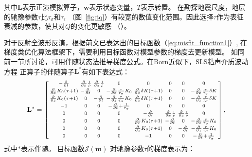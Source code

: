 其中$\mathbf{L}$表示正演模拟算子，$\mathbf{w}$表示状态变量，$T$表示转置。
在勘探地震尺度，地层的驰豫参数$\tau$比$\tau_\sigma$和$\tau_\epsilon$
（图~\ref{fig:tq}）有较宽的数值变化范围。因此选择$\tau$作为表征衰减的参数，使其对$Q$的变化更敏感
（）。

对于反射全波形反演，根据前文已表达出的目标函数（\ref{eq:misfit_function1}）,
在梯度类优化算法框架下，需要利用目标函数对模型参数的梯度去更新模型。
如同前一节所讨论，可用伴随状态法推导梯度公式。在Born近似下，SLS粘声介质波动方程
正算子的伴随算子$\mathbf{L}^\ast$有如下表达式：
\newpage
    \begin{eqnarray}
        \mathbf{L}^\ast =  
        \begin{bmatrix}
            \begin{smallmatrix}
            -\frac{\partial}{\partial t} &\frac{\partial}{\partial x}\frac{1}{\rho}
            &\frac{\partial}{\partial z}\frac{1}{\rho} &0 &0 &0 &0 &0\cr
            \frac{\partial}{\partial x}K_0(\tau +1) &-\frac{\partial}{\partial t} &0 
            &-\frac{\partial}{\partial x}\frac{\tau}{\tau_\sigma}K_0
            &\frac{\partial}{\partial x}\delta K(\tau+1) &0 &0
            &-\frac{\partial}{\partial x}\frac{\tau}{\tau_\sigma}\delta K \cr
            \frac{\partial}{\partial z}K_0(\tau +1) &0 &-\frac{\partial}{\partial t} 
            &-\frac{\partial}{\partial z}\frac{\tau}{\tau_\sigma}K_0
            &\frac{\partial}{\partial z}\delta K(\tau+1) &0 &0
            &-\frac{\partial}{\partial z}\frac{\tau}{\tau_\sigma}\delta K \cr
            -1 &0 &0 &-\frac{\partial}{\partial t}+\frac{1}{\tau_\sigma} &0 &0 &0 &0\cr
            0 &0 &0 &0 &-\frac{\partial}{\partial t} &\frac{\partial}{\partial
            x}\frac{1}{\rho} &\frac{\partial}{\partial z}\frac{1}{\rho} &0\cr
            0 &0 &0 &0 &\frac{\partial}{\partial x}K_0(\tau +1)
            &-\frac{\partial}{\partial t} &0 &-\frac{\partial}{\partial
            x}\frac{\tau}{\tau_\sigma}K_0 \cr
            0 &0 &0 &0 &\frac{\partial}{\partial z}K_0(\tau +1) &0
            &-\frac{\partial}{\partial t} &-\frac{\partial}{\partial
        z}\frac{\tau}{\tau_\sigma}K_0 \cr
           0 &0 &0 &0 &-1 &0 &0 &-\frac{\partial}{\partial t}+\frac{1}{\tau_\sigma}
            \end{smallmatrix}
        \end{bmatrix},
		\label{eq:ad_operator}
    \end{eqnarray}
式中$\ast$表示伴随。
目标函数$\mathcal{J}(\mathbf{m})$
对驰豫参数$\tau$的梯度表示为：
